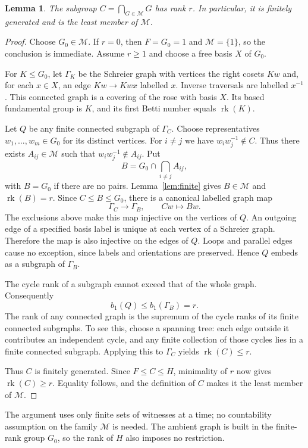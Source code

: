 \documentclass[11pt,a4paper]{article}
\newtheorem{lemma}[theorem]{Lemma}
\theoremstyle{remark}\newtheorem*{remark}{Remark}
\newcommand{\rk}{\operatorname{rk}}
\newcommand{\M}{\mathcal M}
\begin{document}
\begin{lemma}\label{lem:least}
The subgroup $C=\bigcap_{G\in\M}G$ has rank $r$. In particular, it is finitely generated and is the least member of $\M$.
\end{lemma}
\begin{proof}
Choose $G_0\in\M$. If $r=0$, then $F=G_0=1$ and $\M=\{1\}$, so the conclusion is immediate. Assume $r\ge1$ and choose a free basis $X$ of $G_0$.

For $K\le G_0$, let $\Gamma_K$ be the Schreier graph with vertices the right cosets $Kw$ and, for each $x\in X$, an edge $Kw\to Kwx$ labelled $x$. Inverse traversals are labelled $x^{-1}$. This connected graph is a covering of the rose with basis $X$. Its based fundamental group is $K$, and its first Betti number equals $\rk(K)$.

Let $Q$ be any finite connected subgraph of $\Gamma_C$. Choose representatives $w_1,\ldots,w_m\in G_0$ for its distinct vertices. For $i\ne j$ we have $w_iw_j^{-1}\notin C$. Thus there exists $A_{ij}\in\M$ such that $w_iw_j^{-1}\notin A_{ij}$. Put
\[
B=G_0\cap\bigcap_{i\ne j}A_{ij},
\]
with $B=G_0$ if there are no pairs. Lemma~\ref{lem:finite} gives $B\in\M$ and $\rk(B)=r$. Since $C\le B\le G_0$, there is a canonical labelled graph map
\[
\Gamma_C\longrightarrow\Gamma_B,\qquad Cw\longmapsto Bw.
\]
The exclusions above make this map injective on the vertices of $Q$. An outgoing edge of a specified basis label is unique at each vertex of a Schreier graph. Therefore the map is also injective on the edges of $Q$. Loops and parallel edges cause no exception, since labels and orientations are preserved. Hence $Q$ embeds as a subgraph of $\Gamma_B$.

The cycle rank of a subgraph cannot exceed that of the whole graph. Consequently
\[
b_1(Q)\le b_1(\Gamma_B)=r.
\]
The rank of any connected graph is the supremum of the cycle ranks of its finite connected subgraphs. To see this, choose a spanning tree: each edge outside it contributes an independent cycle, and any finite collection of those cycles lies in a finite connected subgraph. Applying this to $\Gamma_C$ yields $\rk(C)\le r$.

Thus $C$ is finitely generated. Since $F\le C\le H$, minimality of $r$ now gives $\rk(C)\ge r$. Equality follows, and the definition of $C$ makes it the least member of $\M$.
\end{proof}
The argument uses only finite sets of witnesses at a time; no countability assumption on the family $\M$ is needed. The ambient graph is built in the finite-rank group $G_0$, so the rank of $H$ also imposes no restriction.
\end{document}
